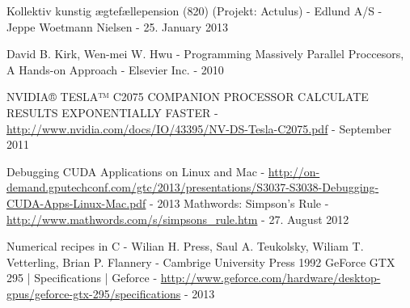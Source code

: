 \documentclass[oribibl]{llncs}
\numberwithin{equation}{section}
\begin{document}
	\begin{thebibliography}{9}
			 Kollektiv kunstig ægtefællepension (820) (Projekt: Actulus) - Edlund A/S - Jeppe Woetmann Nielsen - 25. January 2013 
			
			 David B. Kirk, Wen-mei W. Hwu - Programming Massively Parallel Proccesors, A Hands-on Approach - Elsevier Inc. - 2010
			
			 NVIDIA® TESLA™ C2075 COMPANION PROCESSOR CALCULATE RESULTS EXPONENTIALLY FASTER  - \url{http://www.nvidia.com/docs/IO/43395/NV-DS-Tesla-C2075.pdf} - September 2011
			
			 Debugging CUDA Applications on Linux and Mac - \url{http://on-demand.gputechconf.com/gtc/2013/presentations/S3037-S3038-Debugging-CUDA-Apps-Linux-Mac.pdf} - 2013
			 Mathwords: Simpson's Rule - \url{http://www.mathwords.com/s/simpsons_rule.htm} - 27. August 2012
			
			 Numerical recipes in C - Wilian H. Press, Saul A. Teukolsky, Wiliam T. Vetterling, Brian P. Flannery - Cambrige University Press 1992
			 GeForce GTX 295 | Specifications | Geforce - \url{http://www.geforce.com/hardware/desktop-gpus/geforce-gtx-295/specifications} - 2013
	\end{thebibliography}
	
	
	
\end{document}
